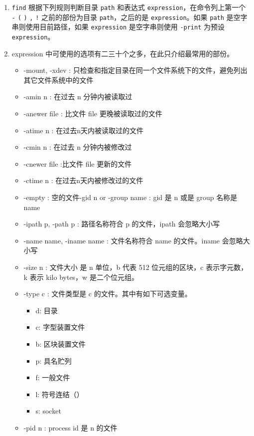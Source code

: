 \documentclass[doctor,openright,twoside]{sjtuthesis}
\providecommand{\tightlist}{%
    \setlength{\itemsep}{0pt}\setlength{\parskip}{0pt}}
\newcommand{\passthrough}[1]{#1}
\theoremstyle{plain}
\theoremstyle{definition}
\theoremstyle{remark}
\theoremstyle{ocrenumbox}
\theoremstyle{plain}
\begin{document}
\begin{enumerate}
\def\labelenumi{\arabic{enumi}.}
\tightlist
\item
  \passthrough{\lstinline!find!} 根据下列规则判断目录 \passthrough{\lstinline!path!} 和表达式 \passthrough{\lstinline!expression!}，在命令列上第一个 \passthrough{\lstinline!-!} \passthrough{\lstinline!(!} \passthrough{\lstinline!)!} \passthrough{\lstinline!,!} \passthrough{\lstinline"!"} 之前的部份为目录 \passthrough{\lstinline!path!}，之后的是 \passthrough{\lstinline!expression!}。如果 \passthrough{\lstinline!path!} 是空字串则使用目前路径，如果 \passthrough{\lstinline!expression!} 是空字串则使用 \passthrough{\lstinline!-print!} 为预设 \passthrough{\lstinline!expression!}。
\item
  expression 中可使用的选项有二三十个之多，在此只介绍最常用的部份。

  \begin{itemize}
  \tightlist
  \item
    -mount, -xdev : 只检查和指定目录在同一个文件系统下的文件，避免列出其它文件系统中的文件
  \item
    -amin n : 在过去 n 分钟内被读取过
  \item
    -anewer file : 比文件 file 更晚被读取过的文件
  \item
    -atime n : 在过去n天内被读取过的文件
  \item
    -cmin n : 在过去 n 分钟内被修改过
  \item
    -cnewer file :比文件 file 更新的文件
  \item
    -ctime n : 在过去n天内被修改过的文件
  \item
    -empty : 空的文件-gid n or -group name : gid 是 n 或是 group 名称是 name
  \item
    -ipath p, -path p : 路径名称符合 p 的文件，ipath 会忽略大小写
  \item
    -name name, -iname name : 文件名称符合 name 的文件。iname 会忽略大小写
  \item
    -size n : 文件大小 是 n 单位，b 代表 512 位元组的区块，c 表示字元数，k 表示 kilo bytes，w 是二个位元组。
  \item
    -type c : 文件类型是 c 的文件。其中有如下可选变量。

    \begin{itemize}
    \tightlist
    \item
      d: 目录
    \item
      c: 字型装置文件
    \item
      b: 区块装置文件
    \item
      p: 具名贮列
    \item
      f: 一般文件
    \item
      l: 符号连结（）
    \item
      s: socket
    \end{itemize}
  \item
    -pid n : process id 是 n 的文件
  \end{itemize}
\end{enumerate}
\end{document}
